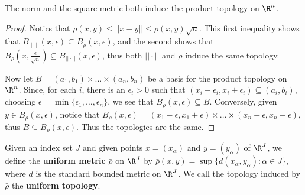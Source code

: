 \begin{theorem}\label{2.2.8}
    The norm and the square metric both induce the product topology on $\R^n$.
\end{theorem}
\begin{proof}
    Notics that $\rho(x,y) \leq ||x-y|| \leq \rho(x,y)\sqrt{n}$. This first
    inequality shows that
    $B_{||\cdot||}(x,\epsilon) \subseteq B_{\rho}(x,\epsilon)$, and the second shows that
    $B_{\rho}(x,\frac{\epsilon}{\sqrt{n}}) \subseteq B_{||\cdot||}(x,\epsilon)$, thus both
    $||\cdot||$ and  $\rho$ induce the same topology.

    Now let  $B=(a_1,b_1) \times \dots \times (a_n,b_n)$ be a basis for the product topology on $
    \R^n$. Since, for each  $i$, there is an  $\epsilon_i>0$ such that
    $(x_i-\epsilon_i,x_i+\epsilon_i) \subseteq (a_i,b_i)$, choosing $\epsilon=\min\{\epsilon_1,
    \dots, \epsilon_n\}$, we see that $B_{\rho}(x,\epsilon) \subseteq B$. Conversely, given $y \in
    B_{\rho}(x,\epsilon)$, notice that $B_{\rho}(x, \epsilon)=(x_1-\epsilon,x_1+\epsilon) \times
    \dots \times (x_n-\epsilon,x_n+\epsilon)$, thus $B \subseteq B_{\rho}(x,\epsilon)$. Thus the
    topologies are the same.
\end{proof}

\begin{definition}
    Given an index set $J$ and given points  $x=(x_{\alpha})$ and
    $y=(y_{\alpha})$ of $\R^J$, we define the \textbf {uniform metric}
    $\bar{\rho}$ on $\R^J$ by $\bar{\rho}(x,y)=\sup\{\bar{d}(x_{\alpha},
    y_{\alpha}): \alpha \in J\}$, where $\bar{d}$ is the standard bounded
    metric on  $\R^J$. We call the topology induced by $\bar{\rho}$ the
    \textbf{uniform topology}.
\end{definition}

